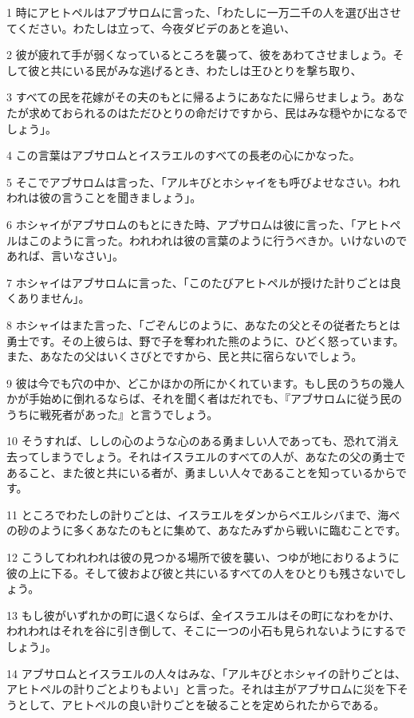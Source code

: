 \par 1 時にアヒトペルはアブサロムに言った、「わたしに一万二千の人を選び出させてください。わたしは立って、今夜ダビデのあとを追い、
\par 2 彼が疲れて手が弱くなっているところを襲って、彼をあわてさせましょう。そして彼と共にいる民がみな逃げるとき、わたしは王ひとりを撃ち取り、
\par 3 すべての民を花嫁がその夫のもとに帰るようにあなたに帰らせましょう。あなたが求めておられるのはただひとりの命だけですから、民はみな穏やかになるでしょう」。
\par 4 この言葉はアブサロムとイスラエルのすべての長老の心にかなった。
\par 5 そこでアブサロムは言った、「アルキびとホシャイをも呼びよせなさい。われわれは彼の言うことを聞きましょう」。
\par 6 ホシャイがアブサロムのもとにきた時、アブサロムは彼に言った、「アヒトペルはこのように言った。われわれは彼の言葉のように行うべきか。いけないのであれば、言いなさい」。
\par 7 ホシャイはアブサロムに言った、「このたびアヒトペルが授けた計りごとは良くありません」。
\par 8 ホシャイはまた言った、「ごぞんじのように、あなたの父とその従者たちとは勇士です。その上彼らは、野で子を奪われた熊のように、ひどく怒っています。また、あなたの父はいくさびとですから、民と共に宿らないでしょう。
\par 9 彼は今でも穴の中か、どこかほかの所にかくれています。もし民のうちの幾人かが手始めに倒れるならば、それを聞く者はだれでも、『アブサロムに従う民のうちに戦死者があった』と言うでしょう。
\par 10 そうすれば、ししの心のような心のある勇ましい人であっても、恐れて消え去ってしまうでしょう。それはイスラエルのすべての人が、あなたの父の勇士であること、また彼と共にいる者が、勇ましい人々であることを知っているからです。
\par 11 ところでわたしの計りごとは、イスラエルをダンからベエルシバまで、海べの砂のように多くあなたのもとに集めて、あなたみずから戦いに臨むことです。
\par 12 こうしてわれわれは彼の見つかる場所で彼を襲い、つゆが地におりるように彼の上に下る。そして彼および彼と共にいるすべての人をひとりも残さないでしょう。
\par 13 もし彼がいずれかの町に退くならば、全イスラエルはその町になわをかけ、われわれはそれを谷に引き倒して、そこに一つの小石も見られないようにするでしょう」。
\par 14 アブサロムとイスラエルの人々はみな、「アルキびとホシャイの計りごとは、アヒトペルの計りごとよりもよい」と言った。それは主がアブサロムに災を下そうとして、アヒトペルの良い計りごとを破ることを定められたからである。
